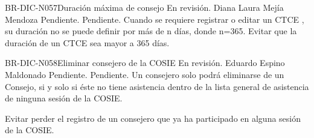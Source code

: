 \begin{BusinessRule}{BR-DIC-N057}{Duración máxima de consejo}
	{\bcCondition} %
	{\btEnabler}     %
	{\blInfluencing}     %
	\BRItem[Estado] En revisión.
	 Diana Laura Mejía Mendoza
	 Pendiente.
	 Pendiente. 
	\BRItem[Descripción] Cuando se requiere registrar o editar un CTCE , su duración no se puede definir por más de n días, donde n=365.
	\BRItem[Motivación] Evitar que la duración de un CTCE sea mayor a 365 días.
\end{BusinessRule}

\begin{BusinessRule}{BR-DIC-N058}{Eliminar consejero de la COSIE}
	{\bcCondition} %
	{\btEnabler}     %
	{\blControlling}     %
	\BRItem[Estado] En revisión.
	 Eduardo Espino Maldonado
	 Pendiente.
	 Pendiente.
	\BRItem[Descripción] Un consejero solo podrá eliminarse de un Consejo, si y solo si éste no tiene asistencia dentro de la lista general de asistencia de ninguna sesión de la COSIE.
	\BRItem[Sentencia] \cdtEmpty
	
	\BRItem[Motivación] Evitar perder el registro de un consejero que ya ha participado en alguna sesión de la COSIE.
\end{BusinessRule}

